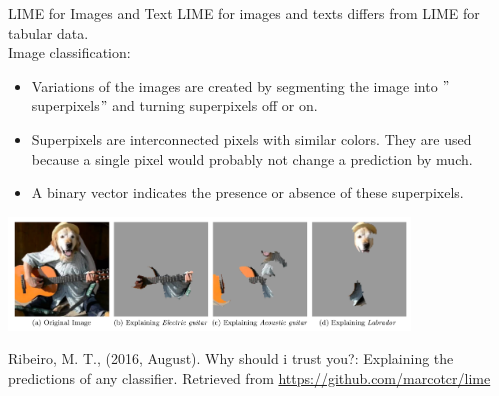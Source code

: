 \documentclass[11pt,compress,t,notes=noshow, xcolor=table]{beamer}
\begin{document}
\begin{vbframe}{LIME for Images and Text}
\normalsize
LIME for images and texts differs from LIME for tabular data. \\[0.2cm]
Image classification: 
  \begin{itemize}
  \item Variations of the images are created by segmenting the image into $"$superpixels$"$ and turning superpixels off or on. 
  \item Superpixels are interconnected pixels with similar colors. They are used because a single pixel would probably not change a prediction by much.
  \item A binary vector indicates the presence or absence of these superpixels.
\end{itemize}
\vspace{-0.3cm}
\begin{center}
 \includegraphics[width=0.8\textwidth]{figure/lime-images}
\end{center}
\vspace{-0.3cm}
\tiny{Ribeiro, M. T., (2016, August). Why should i trust you?: Explaining the predictions of any classifier. Retrieved from \url{https://github.com/marcotcr/lime}\par}
\end{vbframe}

\endlecture
\end{document}
